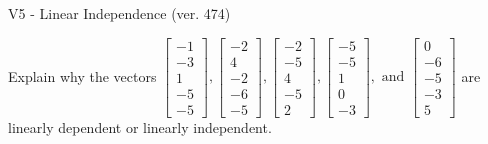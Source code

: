 \begin{exercise}
  \begin{exerciseTitle}V5 - Linear Independence (ver. 474)\end{exerciseTitle}
  \begin{exerciseStatement}
    Explain why the vectors \(\left[\begin{array}{r}
-1 \\
-3 \\
1 \\
-5 \\
-5
\end{array}\right] , \left[\begin{array}{r}
-2 \\
4 \\
-2 \\
-6 \\
-5
\end{array}\right] , \left[\begin{array}{r}
-2 \\
-5 \\
4 \\
-5 \\
2
\end{array}\right] , \left[\begin{array}{r}
-5 \\
-5 \\
1 \\
0 \\
-3
\end{array}\right] , \text{ and } \left[\begin{array}{r}
0 \\
-6 \\
-5 \\
-3 \\
5
\end{array}\right]\) are linearly dependent or linearly independent.	



\end{exerciseStatement}
\end{exercise}
